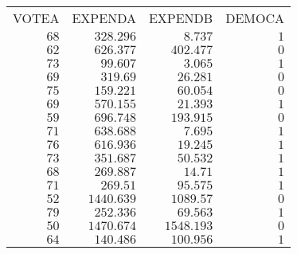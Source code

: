 \documentclass[12pt]{report}
\begin{document}
\begin{table}[H]
	\centering
	\begin{tabular}{lrrr}
		\multicolumn{1}{r}{VOTEA}&\multicolumn{1}{r}{EXPENDA}&\multicolumn{1}{r}{EXPENDB}&\multicolumn{1}{r}{DEMOCA}\\
		\multicolumn{1}{r}{$68$}&\multicolumn{1}{r}{$328.296$}&\multicolumn{1}{r}{$8.737$}&\multicolumn{1}{r}{$1$}\\
		\multicolumn{1}{r}{$62$}&\multicolumn{1}{r}{$626.377$}&\multicolumn{1}{r}{$402.477$}&\multicolumn{1}{r}{$0$}\\
		\multicolumn{1}{r}{$73$}&\multicolumn{1}{r}{$99.607$}&\multicolumn{1}{r}{$3.065$}&\multicolumn{1}{r}{$1$}\\
		\multicolumn{1}{r}{$69$}&\multicolumn{1}{r}{$319.69$}&\multicolumn{1}{r}{$26.281$}&\multicolumn{1}{r}{$0$}\\
		\multicolumn{1}{r}{$75$}&\multicolumn{1}{r}{$159.221$}&\multicolumn{1}{r}{$60.054$}&\multicolumn{1}{r}{$0$}\\
		\multicolumn{1}{r}{$69$}&\multicolumn{1}{r}{$570.155$}&\multicolumn{1}{r}{$21.393$}&\multicolumn{1}{r}{$1$}\\
		\multicolumn{1}{r}{$59$}&\multicolumn{1}{r}{$696.748$}&\multicolumn{1}{r}{$193.915$}&\multicolumn{1}{r}{$0$}\\
		\multicolumn{1}{r}{$71$}&\multicolumn{1}{r}{$638.688$}&\multicolumn{1}{r}{$7.695$}&\multicolumn{1}{r}{$1$}\\
		\multicolumn{1}{r}{$76$}&\multicolumn{1}{r}{$616.936$}&\multicolumn{1}{r}{$19.245$}&\multicolumn{1}{r}{$1$}\\
		\multicolumn{1}{r}{$73$}&\multicolumn{1}{r}{$351.687$}&\multicolumn{1}{r}{$50.532$}&\multicolumn{1}{r}{$1$}\\
		\multicolumn{1}{r}{$68$}&\multicolumn{1}{r}{$269.887$}&\multicolumn{1}{r}{$14.71$}&\multicolumn{1}{r}{$1$}\\
		\multicolumn{1}{r}{$71$}&\multicolumn{1}{r}{$269.51$}&\multicolumn{1}{r}{$95.575$}&\multicolumn{1}{r}{$1$}\\
		\multicolumn{1}{r}{$52$}&\multicolumn{1}{r}{$1440.639$}&\multicolumn{1}{r}{$1089.57$}&\multicolumn{1}{r}{$0$}\\
		\multicolumn{1}{r}{$79$}&\multicolumn{1}{r}{$252.336$}&\multicolumn{1}{r}{$69.563$}&\multicolumn{1}{r}{$1$}\\
		\multicolumn{1}{r}{$50$}&\multicolumn{1}{r}{$1470.674$}&\multicolumn{1}{r}{$1548.193$}&\multicolumn{1}{r}{$0$}\\
		\multicolumn{1}{r}{$64$}&\multicolumn{1}{r}{$140.486$}&\multicolumn{1}{r}{$100.956$}&\multicolumn{1}{r}{$1$}\\

\end{tabular}
\end{table}
\end{document}
